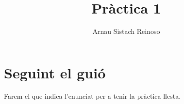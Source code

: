 \documentclass[a4paper]{article}
\author{Arnau Sistach Reinoso}
\title{Pràctica 1}
\begin{document}
\maketitle
\tableofcontents
\newpage

\section{Seguint el guió}

Farem el que indica l'enunciat per a tenir la pràctica llesta.





\end{document}
